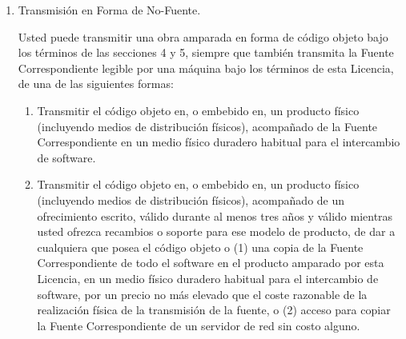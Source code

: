 {\begin{enumerate}
\begin{enumerate}
  \item Si la obra tiene interfaces de usuario interactivas, cada una 
  debe mostrar los Avisos Legales Apropiados; sin embargo, si el Programa 
  tiene interfaces interactivas que no muestren los Avisos Legales 
  Apropiados, tampoco es necesario que su obra lo haga.
\end{enumerate}
Una recopilaci\'{o}n de una obra amparada con otras obras separadas e 
independientes, que no son por su naturaleza extensiones de la obra 
amparada, y que no se combinan con ella con el fin de formar un programa 
m\'{a}s grande, en o sobre un volumen de un medio de almacenamiento o 
distribuci\'{o}n, es llamado un ``agregado'' si la recopilaci\'{o}n y su 
resultante derechos de autor (``copyright'') no son usados para limitar el acceso o los 
derechos legales de los usuarios de la recopilaci\'{o}n m\'{a}s all\'{a} de lo que 
las obras individuales permitan.  La inclusi\'{o}n de una obra amparada en 
un agregado no provoca que esta Licencia se aplique a los otros 
componentes del agregado.

\item Transmisi\'{o}n en Forma de No-Fuente.

Usted puede transmitir una obra amparada en forma de c\'{o}digo objeto 
bajo los t\'{e}rminos de las secciones 4 y 5, siempre que tambi\'{e}n transmita
la Fuente Correspondiente legible por una m\'{a}quina bajo los t\'{e}rminos de 
esta Licencia, de una de las siguientes formas:
  \begin{enumerate}
  \item Transmitir el c\'{o}digo objeto en, o embebido en, un producto f\'{i}sico 
    (incluyendo medios de distribuci\'{o}n f\'{i}sicos), acompa\~nado de la Fuente 
    Correspondiente en un medio f\'{i}sico duradero habitual para el 
    intercambio de software.

  \item Transmitir el c\'{o}digo objeto en, o embebido en, un producto f\'{i}sico 
    (incluyendo medios de distribuci\'{o}n f\'{i}sicos), acompa\~nado de un 
    ofrecimiento escrito, v\'{a}lido durante al menos tres a\~nos y v\'{a}lido 
    mientras usted ofrezca recambios o soporte para ese modelo de 
    producto, de dar a cualquiera que posea el c\'{o}digo objeto o (1) una
    copia de la Fuente Correspondiente de todo el software en el 
    producto amparado por esta Licencia, en un medio f\'{i}sico duradero 
    habitual para el intercambio de software, por un precio no m\'{a}s 
    elevado que el coste razonable de la realizaci\'{o}n f\'{i}sica de la 
    transmisi\'{o}n de la fuente, o (2) acceso para copiar la Fuente 
    Correspondiente de un servidor de red sin costo alguno.


\end{enumerate}
\end{enumerate}}
